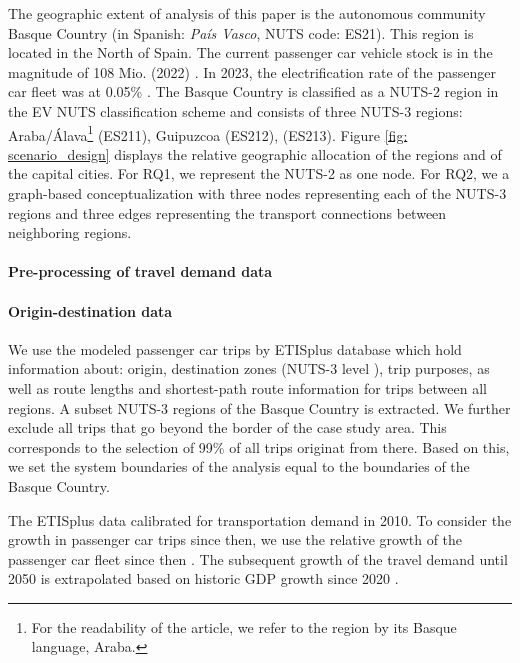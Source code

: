 \documentclass[preprint,review,11pt, authoryear]{elsarticle}
\begin{document}
        The geographic extent of  analysis of this paper is the autonomous community Basque Country (in Spanish: \textit{País Vasco}, NUTS code: ES21). This region is located in the North of Spain. The current passenger car vehicle stock is in the magnitude of 108 Mio. (2022) \citep{eurostat_transport2024}. In 2023, the electrification rate of the passenger car fleet was at 0.05\% \citep{eurostat_zev_2024}. The Basque Country is classified as a NUTS-2 region in the EV NUTS classification scheme \citep{eurostat_nuts} and consists of three NUTS-3 regions: Araba/Álava\footnote{For the readability of the article, we refer to the region by its Basque language, Araba.} (ES211), Guipuzcoa (ES212),  (ES213). Figure \ref{fig: scenario_design} displays the relative geographic allocation of the regions and of the capital cities. For RQ1, we represent the NUTS-2 as one node.
        For RQ2, we  a graph-based conceptualization with three nodes representing each of the NUTS-3 regions and three edges representing the transport connections between neighboring regions.    

 

        \paragraph*{Pre-processing of travel demand data}
            \paragraph*{Origin-destination data}
            We use the modeled passenger car trips by ETISplus data\deleted{ }base \citep{ETISplus_233596} which hold information about: origin, destination zones (NUTS-3 level \citep{eurostat_nuts}), trip purposes, as well as route lengths and shortest-path route information for trips between all regions. 
            A subset  NUTS-3 regions of the Basque Country is extracted. We further exclude all trips that go beyond the border of the case study area. This corresponds to the selection of 99\% of all trips originat from there. Based on this, we set the system boundaries of the analysis equal to the boundaries of the Basque Country.

            The ETISplus data  calibrated for transportation demand in 2010. To consider the growth in passenger car trips since then, we use the relative growth of the passenger car fleet since then \citep{arval2023fleet}. The subsequent growth of the travel demand until 2050 is extrapolated based on historic GDP growth since 2020 \citep{statistaGDPSpain}.
           
\end{document}
